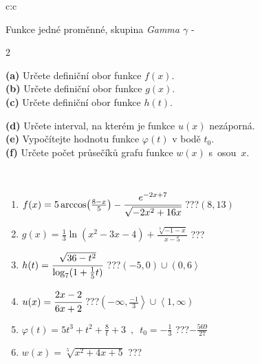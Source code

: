 \documentclass[10pt]{report}
\begin{document}
\begin{tabular}{c:c}
\begin{minipage}[c][104.5mm][t]{0.5\linewidth}
\begin{center}
{\huge Funkce jedné proměnné, skupina \textit{Gamma $\gamma$} -}\\[5mm]
\begin{minipage}{0.95\linewidth}
\begin{center}
{\small \begin{multicols}{2} \raggedright
\textbf{(a)} Určete definiční obor funkce \(f(x)\). \\[1mm]
\textbf{(b)} Určete definiční obor funkce \(g(x)\). \\[1mm]
\textbf{(c)} Určete definiční obor funkce \(h(t)\). \par \columnbreak
\textbf{(d)} Určete interval, na kterém je funkce \(u(x)\) nezáporná. \\[1mm]
\textbf{(e)} Vypočítejte hodnotu funkce \(\varphi(t)\) v bodě \(t_0\). \\[1mm]
\textbf{(f)} Určete počet průsečíků grafu funkce \(w(x)\) s~osou~\(x\). \\[1mm]
\end{multicols}
}
\end{center}
\end{minipage}
\\[4mm]
\begin{minipage}{0.79\linewidth}
\begin{center}
\begin{varwidth}{\linewidth}
\begin{enumerate}
\small
\item $f(x) = 5\arccos\!\left( \frac{8-x}{5} \right) - \cfrac{e^{-2x+7}}{\sqrt{-2x^2+16x}}$\quad \dotfill\; ???\;\dotfill \quad $\left(8 , 13\right)$
\item $g(x) = \frac{1}{3} \ln{\!(x^2-3x-4)}+\frac{\sqrt[3]{-1-x}}{x-5}$\quad \dotfill\; ???\;\dotfill {}
\item $h(t) = \cfrac{\sqrt{36-t^2}}{\log_7(1+\frac{1}{5}t)}$\quad \dotfill\; ???\;\dotfill \quad $\left(-5 , 0\right)\cup\left(0 , 6\right\rangle$
\item $u(x) = \cfrac{2x-2}{6x+2}$\quad \dotfill\; ???\;\dotfill \quad $\left(-\infty , \frac{-1}{3}\right\rangle\cup\left\langle1 , \infty\right)$
\item $\varphi(t) = 5t^3+t^2+\frac{8}{t}+3 \enspace , \enspace t_0=-\frac{1}{3}$\quad \dotfill\; ???\;\dotfill \quad $-\frac{569}{27}$
\item $w(x) = \sqrt[5]{x^2+4x+5}$\quad \dotfill\; ???\;\dotfill {}
\end{enumerate}

\end{varwidth}
\end{center}
\end{minipage}
\end{center}
\end{minipage}
\end{tabular}
\end{document}
